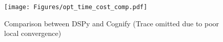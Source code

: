 {
\begin{figure}[h]
\centerline{\texttt{[image: Figures/opt\_time\_cost\_comp.pdf]}}
\vspace{-0.1in}
 {Comparison between DSPy and Cognify (Trace omitted due to poor local convergence)}
\label{fig-opt-time-cost}
\end{figure}
}